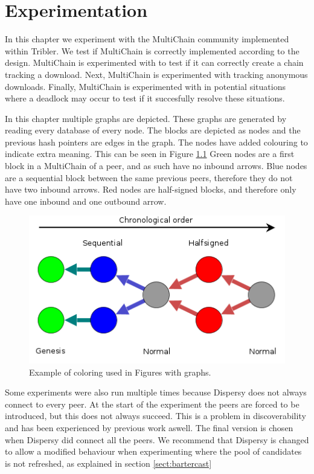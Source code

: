 \chapter{Experimentation}
In this chapter we experiment with the MultiChain community implemented within Tribler.
We test if MultiChain is correctly implemented according to the design.
MultiChain is experimented with to test if it can correctly create a chain tracking a download.
Next, MultiChain is experimented with tracking anonymous downloads.
Finally, MultiChain is experimented with in potential situations where a deadlock may occur
to test if it succesfully resolve these situations.

In this chapter multiple graphs are depicted.
These graphs are generated by reading every database of every node.
The blocks are depicted as nodes and the previous hash pointers are edges in the graph.
The nodes have added colouring to indicate extra meaning.
This can be seen in Figure \ref{fig:graph-example}
Green nodes are a first block in a MultiChain of a peer,
and as such have no inbound arrows.
Blue nodes are a sequential block between the same previous peers,
therefore they do not have two inbound arrows.
Red nodes are half-signed blocks,
and therefore only have one inbound and one outbound arrow.

\begin{figure}[!h]
	\centerline{\includegraphics[scale=0.6]{experimentation/example.png}}
	\caption{Example of coloring used in Figures with graphs.}
	\label{fig:graph-example}
\end{figure}

Some experiments were also run multiple times because Dispersy does not always connect to every peer.
At the start of the experiment the peers are forced to be introduced,
but this does not always succeed.
This is a problem in discoverability and has been experienced by previous work aswell\cite{ruigrok-anonymous}.
The final version is chosen when Dispersy did connect all the peers.
We recommend that Dispersy is changed to allow a modified behaviour when experimenting
where the pool of candidates is not refreshed,
as explained in section \ref{sect:bartercast}

